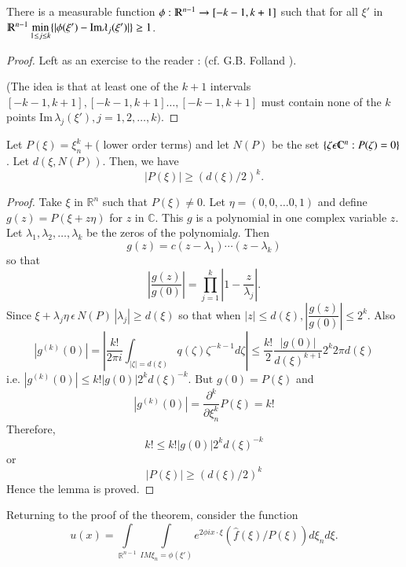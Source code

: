 \setcounter{lem}{2}
\begin{lem} \label{chap2:sec1:lem2.3}%
 There is a measurable function $\phi : \varmathbb{R}^{n-1} \to [-k-1,
   k+1]$ such that for all $\xi'$ in $\varmathbb{R}^{n-1}
 \min\limits_{1 \leq j \leq k} \{ | \phi (\xi') - \text{Im} \lambda_j (\xi')
 |\} \geq 1$.  
\end{lem}

\begin{proof}
  Left as an exercise to the reader : (cf. G.B. Folland \cite{1}).

  (The idea is that at least one of the $k+1$ intervals $[-k-1, k+1],
  [-k-1, k+1]\ldots, [-k-1, k+1]$ must contain none of the $k$
  points $\text{Im}\, \lambda_j(\xi'),  j = 1, 2, \ldots, k)$. 
\end{proof}

\setcounter{lem}{3}
\begin{lem} \label{chap2:sec1:lem2.4}%
  Let $P(\xi) = \xi^k_n+$( lower order terms) and let $N(P)$ be the set
  $\{ \zeta \epsilon \varmathbb{C}^n : P(\zeta) = 0 \}$. Let $d (\xi
  ,N(P))$. Then, we have  
  $$
  |P(\xi)| \geq (d ( \xi) /2)^k.
  $$
\end{lem}

\begin{proof}
  Take $\xi$ in $\mathbb{R}^n$ such that $P(\xi) \neq 0$. Let $\eta =
  (0, 0, \ldots 0,1)$ and define $g(z) = P(\xi +z \eta)$ for $z$ in
  $\mathbb{C}$. This $g$ is a polynomial in one complex variable
  $z$. Let $\lambda_1, \lambda_2, \ldots, \lambda_k$ be the zeros of
  the polynomial\pageoriginale $g$. Then  
  $$
  g(z) = c(z-\lambda_1) \cdots(z - \lambda_k)
  $$
  so that  
  $$
  |\frac{g(z)}{g(0)}| = \prod^k_{j=1} | 1- \frac{z}{\lambda_j}|.
  $$
  Since $\xi + \lambda_j \eta \,\epsilon\, N(P)\, |\lambda_j|\geq d(\xi)$
  so that when $|z| \leq d(\xi), |\dfrac{g(z)}{g(0)}| \leq 2^k$. Also 
  $$
  |g^{(k)} (0)| = | \frac{k!}{2 \pi i} \int_{|\zeta|=d(\xi)} q (\zeta)
  \zeta^{-k-1} d \zeta | \leq \frac{k!}{2}\frac{|g(0)|}{d(\xi)^{k+1}}
  2^k 2 \pi d (\xi) 
  $$
  i.e. $|g^{(k)} (0)| \leq k! |g(0) | 2^k d(\xi)^{-k}. \text{ But } g(0)
  = P(\xi) $ and  
  $$
  |g^{(k)} (0)| = \frac{\partial^k}{\partial \xi^k_n} P(\xi) = k!
  $$
  Therefore, 
  $$
  k! \leq k! |g (0)| 2^k d(\xi)^{-k}
  $$
  or  
  $$
  |P(\xi)| \geq (d(\xi)/2)^k
  $$
  Hence the lemma is proved. 
\end{proof} 

Returning to the proof of the theorem, consider the function 
$$
u(x) = \int\limits_{\mathbb{R}^{n-1}} \int\limits_{ IM \xi_n = \phi (\xi')}
e^{2 \phi i x\cdot \xi }(\hat{f}(\xi) /P (\xi)) d \xi_n d \xi. 
$$

